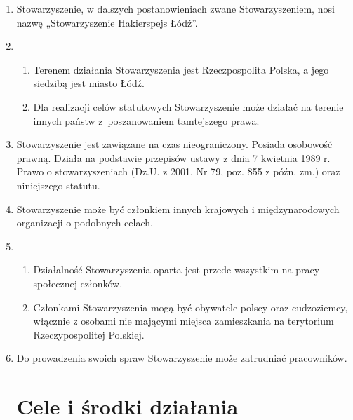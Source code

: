 \documentclass[chapterprefix,notitlepage]{article}
\begin{document}
\begin{enumerate}

	\item Stowarzyszenie, w dalszych postanowieniach zwane Stowarzyszeniem, nosi nazwę „Stowarzyszenie Hakierspejs Łódź”.
	
	\item \begin{enumerate}
		\item Terenem działania Stowarzyszenia jest Rzeczpospolita Polska, a jego siedzibą jest miasto Łódź.
		\item Dla realizacji celów statutowych Stowarzyszenie może działać na terenie innych państw z~poszanowaniem tamtejszego prawa.
	\end{enumerate}
	
	\item Stowarzyszenie jest zawiązane na czas nieograniczony. Posiada osobowość prawną. Działa na podstawie przepisów ustawy z dnia 7 kwietnia 1989 r. Prawo o stowarzyszeniach (Dz.U. z 2001, Nr 79, poz. 855 z późn. zm.) oraz niniejszego statutu.
	
	\item Stowarzyszenie może być członkiem innych krajowych i międzynarodowych organizacji o podobnych celach.
	
	\item \begin{enumerate}
		\item Działalność Stowarzyszenia oparta jest przede wszystkim na pracy społecznej członków.
		\item Członkami Stowarzyszenia mogą być obywatele polscy oraz cudzoziemcy, włącznie z osobami nie mającymi miejsca zamieszkania na terytorium Rzeczypospolitej Polskiej.
	\end{enumerate}
	
	\item Do prowadzenia swoich spraw Stowarzyszenie może zatrudniać pracowników.
	
	
\section{Cele i środki działania}


\end{enumerate}
\end{document}
